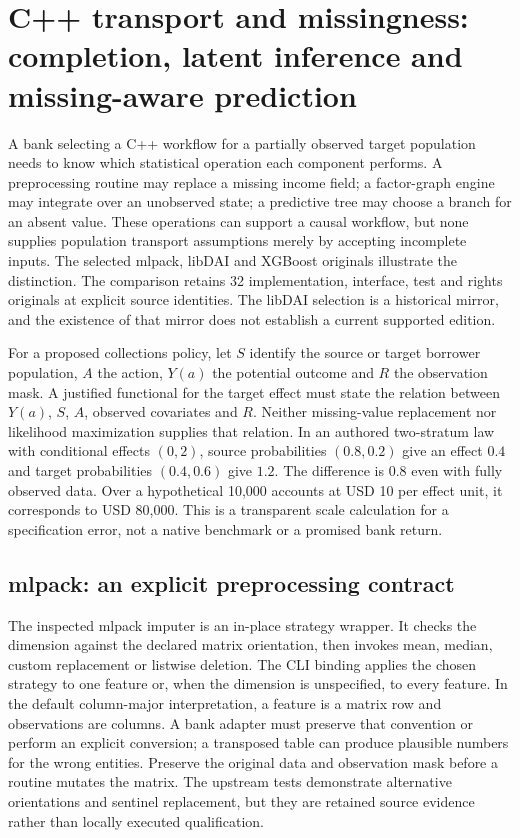 \section[C++ transport and missingness contracts]{C++ transport and missingness: completion, latent inference and missing-aware prediction}
\label{sec:exec25-ctm}

A bank selecting a C++ workflow for a partially observed target population needs to know which statistical operation each component performs. A preprocessing routine may replace a missing income field; a factor-graph engine may integrate over an unobserved state; a predictive tree may choose a branch for an absent value. These operations can support a causal workflow, but none supplies population transport assumptions merely by accepting incomplete inputs. The selected mlpack, libDAI and XGBoost originals illustrate the distinction. The comparison retains 32 implementation, interface, test and rights originals at explicit source identities. The libDAI selection is a historical mirror, and the existence of that mirror does not establish a current supported edition.~\citep{exec25_ctm_mlpack,exec25_ctm_libdai,exec25_ctm_xgboost}

For a proposed collections policy, let $S$ identify the source or target borrower population, $A$ the action, $Y(a)$ the potential outcome and $R$ the observation mask. A justified functional for the target effect must state the relation between $Y(a)$, $S$, $A$, observed covariates and $R$. Neither missing-value replacement nor likelihood maximization supplies that relation. In an authored two-stratum law with conditional effects $(0,2)$, source probabilities $(0.8,0.2)$ give an effect $0.4$ and target probabilities $(0.4,0.6)$ give $1.2$. The difference is $0.8$ even with fully observed data. Over a hypothetical 10,000 accounts at USD 10 per effect unit, it corresponds to USD 80,000. This is a transparent scale calculation for a specification error, not a native benchmark or a promised bank return.~\citep{exec25_ctm_choice}

\subsection*{mlpack: an explicit preprocessing contract}
The inspected mlpack imputer is an in-place strategy wrapper. It checks the dimension against the declared matrix orientation, then invokes mean, median, custom replacement or listwise deletion. The CLI binding applies the chosen strategy to one feature or, when the dimension is unspecified, to every feature. In the default column-major interpretation, a feature is a matrix row and observations are columns. A bank adapter must preserve that convention or perform an explicit conversion; a transposed table can produce plausible numbers for the wrong entities. Preserve the original data and observation mask before a routine mutates the matrix. The upstream tests demonstrate alternative orientations and sentinel replacement, but they are retained source evidence rather than locally executed qualification.~\citep{exec25_ctm_mlpack}

